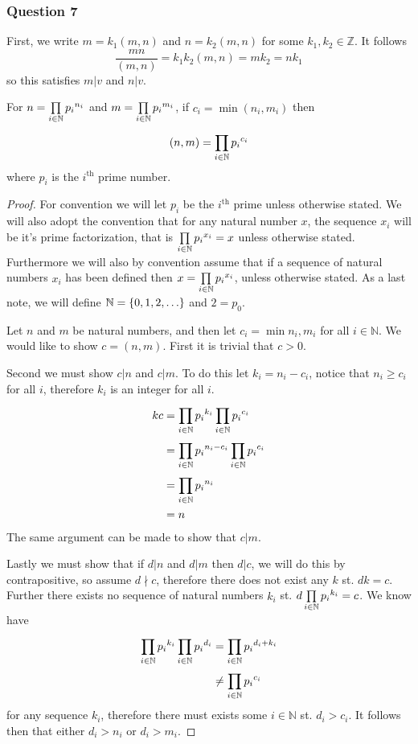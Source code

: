 \documentclass{article}
\begin{document}
\subsubsection{Question 7}

First, we write $m = k_1(m,n)$ and $n=k_2(m,n)$ for some $k_1,k_2\in\mathbb Z$. It follows $$\frac{mn}{(m,n)} = k_1k_2(m,n) = mk_2 = nk_1$$ so this satisfies $m|v$ and $n|v$.

\newcommand{\factorize}[2]{\prodacross{{#2}\in\mathbb N}{{p_{#2}}^{{#1}_{#2}}}}

\begin{lemma}
	For $n = \factorize ni$ and $m = \factorize mi$, if $c_i = \min(n_i,m_i)$ then $$(n,m) = \factorize{c}{i}$$ where $p_i$ is the $i^{\text{th}}$ prime number. 
\end{lemma}

\begin{proof}
	For convention we will let $p_i$ be the $i^{\text{th}}$ prime unless otherwise stated. We will also adopt the convention that for any natural number $x$, the sequence $x_i$ will be it's prime factorization, that is $\factorize{x}{i} = x$ unless otherwise stated. Furthermore we will also by convention assume that if a sequence of natural numbers $x_i$ has been defined then $x = \factorize{x}{i}$, unless otherwise stated. As a last note, we will define $\mathbb N = \left\{ {0,1,2,\ldots} \right\}$ and $2 = p_0$.
	
	Let $n$ and $m$ be natural numbers, and then let $c_i = \min{n_i,m_i}$ for all $i\in\mathbb N$. We would like to show $c=(n,m)$. First it is trivial that $c>0$.
	
	Second we must show $c|n$ and $c|m$. To do this let $k_i = n_i - c_i$, notice that $n_i \ge c_i$ for all $i$, therefore $k_i$ is an integer for all $i$.
	\begin{align*}
	kc &= \factorize ki \factorize ci \\
	&= \prodacross{i\in\mathbb N}{{p_i}^{n_i-c_i}}\factorize ci \\
	&= \prodacross{i\in\mathbb N}{{p_i}^{n_i}} \\
	&= n
	\end{align*}
	The same argument can be made to show that $c|m$.
	
	Lastly we must show that if $d|n$ and $d|m$ then $d|c$, we will do this by contrapositive, so assume $d\nmid c$, therefore there does not exist any $k$ st. $dk = c$. Further there exists no sequence of natural numbers $k_i$ st. $d\factorize ki = c$. We know have
	\begin{align*}
	\factorize ki \factorize di &= \prodacross{i\in\mathbb N}{{p_i}^{d_i+k_i}} \\
	&\not= \factorize ci
	\end{align*}
	for any sequence $k_i$, therefore there must exists some $i\in\mathbb N$ st. $d_i > c_i$. It follows then that either $d_i > n_i$ or $d_i > m_i$.
\end{proof}
\end{document}
